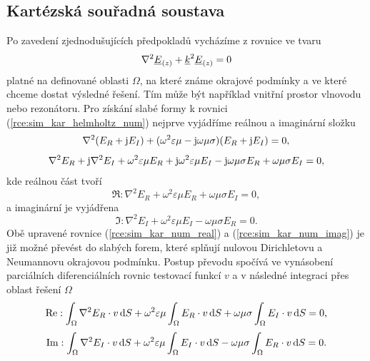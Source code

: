 \subsection{Kartézská souřadná soustava} \label{subsec:sim_kar}
Po zavedení zjednodušujících předpokladů vycházíme z rovnice ve tvaru
\begin{equation}
	\nabla^{2}{\underline{E}}_{(z)} +{\underline{k}}^{2}{\underline{E}}_{(z)} = 0
	\label{rce:sim_kar_helmholtz_num} 
\end{equation}
platné na definované oblasti $\Omega$, na které známe okrajové podmínky a ve které chceme dostat výsledné řešení. Tím může být například vnitřní prostor vlnovodu nebo rezonátoru. Pro získání slabé formy k rovnici (\ref{rce:sim_kar_helmholtz_num}) nejprve vyjádříme reálnou a imaginární složku
\begin{displaymath}
	\nabla^{2}(E_R + \mathrm{j} E_I) + (\omega^{2}\varepsilon\mu - \mathrm{j}\omega\mu\sigma)(E_R + \mathrm{j} E_I) = 0,
\end{displaymath}
\begin{displaymath}
	\nabla^{2} E_R + \mathrm{j}\nabla^{2} E_I + \omega^{2}\varepsilon\mu E_R + \mathrm{j}\omega^{2}\varepsilon\mu E_I - \mathrm{j}\omega\mu\sigma E_R + \omega\mu\sigma E_I = 0,
\end{displaymath}
kde reálnou část tvoří
\begin{equation}
	\Re : \nabla^{2} E_R + \omega^{2}\varepsilon\mu E_R + \omega\mu\sigma E_I = 0,
	\label{rce:sim_kar_num_real} 
\end{equation}
a imaginární je vyjádřena
\begin{equation}
	\Im : \nabla^{2} E_I + \omega^{2}\varepsilon\mu E_I - \omega\mu\sigma E_R = 0.
	\label{rce:sim_kar_num_imag} 
\end{equation}
Obě upravené rovnice (\ref{rce:sim_kar_num_real}) a (\ref{rce:sim_kar_num_imag}) je již možné převést do slabých forem, které splňují nulovou Dirichletovu a Neumannovu okrajovou podmínku. Postup převodu spočívá ve vynásobení parciálních diferenciálních rovnic testovací funkcí $v$ a v následné integraci přes oblast řešení $\Omega$ 
\begin{equation}
	\mathrm{Re} : \int_{\Omega}\nabla^{2} E_R\cdot v \,\mathrm{d} S + \omega^{2}\varepsilon\mu\int_{\Omega} E_R\cdot v\,\mathrm{d} S + \omega\mu\sigma\int_{\Omega} E_I\cdot v\,\mathrm{d} S = 0,
	\label{rce:sim_kar_weak_odv_real} 
\end{equation}
\begin{equation}
	\mathrm{Im} : \int_{\Omega}\nabla^{2} E_I\cdot v\,\mathrm{d} S + \omega^{2}\varepsilon\mu\int_{\Omega} E_I\cdot v\,\mathrm{d} S - \omega\mu\sigma\int_{\Omega} E_R\cdot v\,\mathrm{d} S = 0.
	\label{rce:sim_kar_weak_odv_imag} 
\end{equation}
